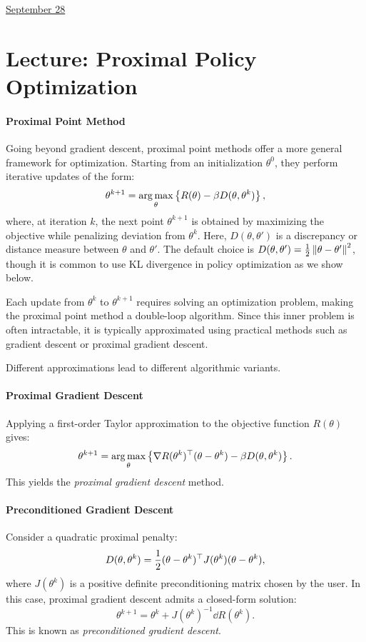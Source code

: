 \documentclass[11pt,letterpaper]{article}
\begin{document}
\href{run:2025-09-28-2.tex}{\Huge September 28} 

\section{Lecture: Proximal Policy Optimization}

\paragraph{Proximal Point Method} 
Going beyond gradient descent, proximal point methods offer a more general framework for optimization. Starting from an initialization $\theta^0$, they perform iterative updates of the form:
$$
\theta^{k+1} = \argmax_{\theta} 
  \left \{ R(\theta) - \beta D(\theta, \theta^k) \right \},
$$
where, at iteration $k$, the next point $\theta^{k+1}$ is obtained by maximizing the objective while penalizing deviation from $\theta^k$. Here, $D(\theta, \theta')$ is a discrepancy or distance measure between $\theta$ and $\theta'$. The default choice is $D(\theta, \theta') = \frac{1}{2}\norm{\theta - \theta'}^2$, though it is common to use KL divergence in policy optimization as we show below. 

Each update from $\theta^k$ to $\theta^{k+1}$ requires solving an optimization problem, making the proximal point method a double-loop algorithm. Since this inner problem is often intractable, it is typically approximated using practical methods such as gradient descent or proximal gradient descent. 

Different approximations lead to different algorithmic variants.




\paragraph{Proximal Gradient Descent} 
Applying a first-order Taylor approximation to the objective function $R(\theta)$ gives:
$$
\theta^{k+1} = \argmax_{\theta} 
  \left \{ \dd R(\theta^k) \tt (\theta - \theta^k) - \beta D(\theta, \theta^k) \right \}.
$$
This yields the \emph{proximal gradient descent} method.

\paragraph{Preconditioned Gradient Descent}
Consider a quadratic proximal penalty:
$$
D(\theta, \theta^k) = \frac{1}{2}(\theta-\theta^k)\tt J(\theta^k)(\theta - \theta^k),
$$
where $J(\theta^k)$ is a positive definite preconditioning matrix chosen by the user. In this case, proximal gradient descent admits a closed-form solution:
$$
\theta^{k+1} = \theta^k + J(\theta^k)^{-1} \dd R(\theta^k).
$$
This is known as \emph{preconditioned gradient descent}.
\end{document}
